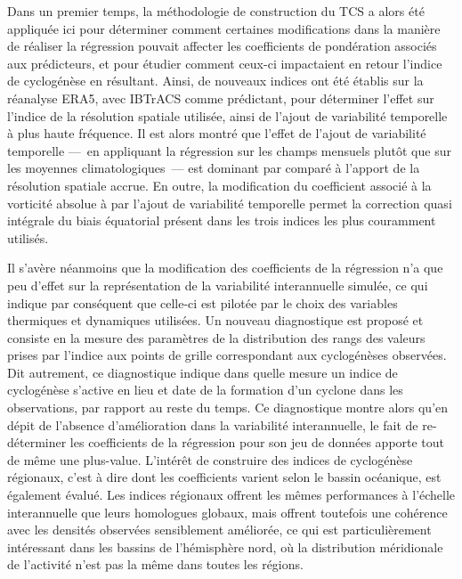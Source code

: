 \documentclass[../main.tex]{subfiles}
\begin{document}
Dans un premier temps, la méthodologie de construction du TCS a alors été appliquée ici pour déterminer comment certaines modifications dans la manière de
réaliser la régression pouvait affecter les coefficients de pondération associés aux prédicteurs, et pour étudier comment ceux-ci impactaient en retour l'indice
de cyclogénèse en résultant. Ainsi, de nouveaux indices ont été établis sur la réanalyse ERA5, avec IBTrACS comme prédictant, pour déterminer l'effet sur
l'indice de la résolution spatiale utilisée, ainsi de l'ajout de variabilité temporelle à plus haute fréquence. Il est alors montré que l'effet de l'ajout de
variabilité temporelle ---~en appliquant la régression sur les champs mensuels plutôt que sur les moyennes climatologiques~--- est dominant par comparé à
l'apport de la résolution spatiale accrue. En outre, la modification du coefficient associé à la vorticité absolue à  par l'ajout de variabilité
temporelle permet la correction quasi intégrale du biais équatorial présent dans les trois indices les plus couramment utilisés.

Il s'avère néanmoins que la modification des coefficients de la régression n'a que peu d'effet sur la représentation de la variabilité interannuelle simulée, ce
qui indique par conséquent que celle-ci est pilotée par le choix des variables thermiques et dynamiques utilisées. Un nouveau diagnostique est proposé et
consiste en la mesure des paramètres de la distribution des rangs des valeurs prises par l'indice aux points de grille correspondant aux cyclogénèses observées.
Dit autrement, ce diagnostique indique dans quelle mesure un indice de cyclogénèse s'active en lieu et date de la formation d'un cyclone dans les observations,
par rapport au reste du temps. Ce diagnostique montre alors qu'en dépit de l'absence d'amélioration dans la variabilité interannuelle, le fait de re-déterminer
les coefficients de la régression pour son jeu de données apporte tout de même une plus-value. L'intérêt de construire des indices de cyclogénèse régionaux,
c'est à dire dont les coefficients varient selon le bassin océanique, est également évalué. Les indices régionaux offrent les mêmes performances à l'échelle
interannuelle que leurs homologues globaux, mais offrent toutefois une cohérence avec les densités observées sensiblement améliorée, ce qui est particulièrement
intéressant dans les bassins de l'hémisphère nord, où la distribution méridionale de l'activité n'est pas la même dans toutes les régions.
\end{document}
